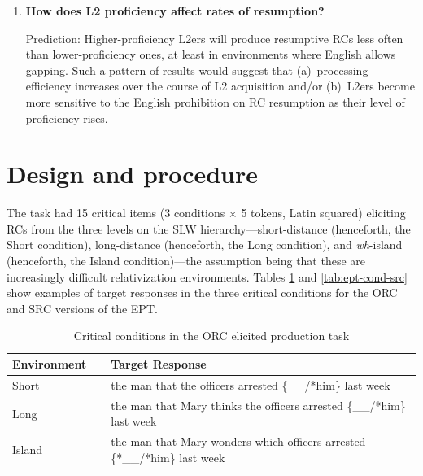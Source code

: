 \begin{enumerate}[\bfseries RQ3:,itemsep=5pt]
\item {\bfseries How does L2 proficiency affect rates of resumption?}\par\nobreak
Prediction: Higher-proficiency L2ers will produce resumptive RCs less often than lower-proficiency ones, at least in environments where English allows gapping. Such a pattern of results would suggest that (a)~processing efficiency increases over the course of L2 acquisition and/or (b)~L2ers become more sensitive to the English prohibition on RC resumption as their level of proficiency rises.
\end{enumerate}

\section{Design and procedure}\label{ept-design}

The task had 15 critical items (3 conditions × 5 tokens, Latin squared) eliciting RCs from the three levels on the SLW hierarchy---short-distance (henceforth, the Short condition), long-distance (henceforth, the Long condition), and \textit{wh}-island (henceforth, the Island condition)---the assumption being that these are increasingly difficult relativization environments. Tables \ref{tab:ept-cond-orc} and \ref{tab:ept-cond-src} show examples of target responses in the three critical conditions for the ORC and SRC versions of the EPT.

\begin{table}
\caption{Critical conditions in the ORC elicited production task}\label{tab:ept-cond-orc}
\raggedright{}
\begin{tabularx}{\linewidth}{lX}\toprule
Environment~~ & Target Response \\\midrule
Short & the man that the officers arrested \{\_\_/*him\} last week \\
Long & the man that Mary thinks the officers arrested \{\_\_/*him\} last week \\
Island & the man that Mary wonders which officers arrested \{*\_\_/*him\} last week \\\bottomrule
\end{tabularx}
\vspace{-12pt}
\end{table}

